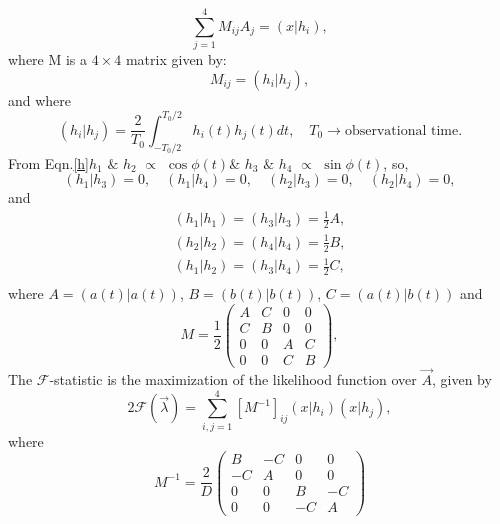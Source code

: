 \documentclass{ttuthes2007}
\begin{document}
\begin{equation}
\sum_{j=1}^4M_{ij}A_j =(x|h_i),
\end{equation}
where M is a $4 \times 4$ matrix given by:
\begin{equation}
M_{ij} = (h_i|h_j),
\end{equation}
and where
\begin{equation}
(h_i|h_j)=\frac{2}{T_0}\int_{-T_0/2}^{T_0/2}h_i(t)h_j(t)dt, \quad
T_0 \rightarrow \text{observational time.}
\end{equation}
From Eqn.\ref{h}\quad $h_1$ $\&$ $h_2$ $\propto$ $\cos{\phi(t)}$\quad \& \quad $h_3$ $\&$ $h_4$
$\propto$ $\sin{\phi(t)}$, so,
\begin{equation}
(h_1|h_3)=0, \quad (h_1|h_4)=0, \quad (h_2|h_3)=0, \quad (h_2|h_4)=0,  
\end{equation}
and
\begin{equation}
\begin{split}
(h_1|h_1)=(h_3|h_3)=\frac{1}{2}A,\\
(h_2|h_2)=(h_4|h_4)=\frac{1}{2}B,\\
(h_1|h_2)=(h_3|h_4)=\frac{1}{2}C,\\
\end{split}
\end{equation}
where  $A=(a(t)|a(t))$, \quad  $B=(b(t)|b(t))$, \quad  $C=(a(t)|b(t))$ and 
\begin{equation*}
M=\frac{1}{2}
\begin{pmatrix}
A & C & 0 & 0\\
C & B & 0 & 0\\
0 & 0 & A & C\\
0 & 0 & C & B
\end{pmatrix},
\end{equation*}
The $\mathcal{F}$-statistic is the maximization of the likelihood function over
$\vec{A}$, given by 
\begin{equation}
2\mathcal{F}(\vec{\lambda})=\sum_{i,j=1}^{4}[M^{-1}]_{ij}(x|h_i)(x|h_j),
\end{equation}
where
\begin{equation*}                                                               
M^{-1}=\frac{2}{D}                                                                   
\begin{pmatrix}                                                                 
B & -C & 0 & 0\\                                                                 
-C & A & 0 & 0\\                                                                 
0 & 0 & B & -C\\                                                                 
0 & 0 & -C & A                                                                   
\end{pmatrix}                                                                   
\end{equation*} 
\end{document}
